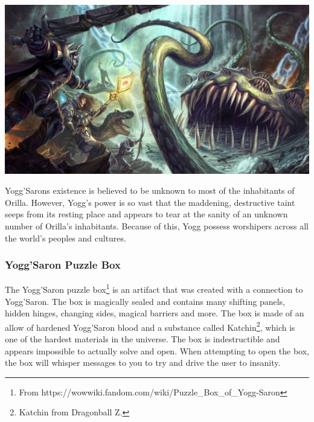 \begin{center}
	\includegraphics[width=\linewidth]{img/WoW/yogg-saron.jpg}
\end{center}

Yogg'Sarons existence is believed to be unknown to most of the inhabitants of Orilla. However, Yogg's power is so vast that the maddening, destructive taint seeps from its resting place and appears to tear at the sanity of an unknown number of Orilla's inhabitants. Because of this, Yogg possess worshipers across all the world's peoples and cultures.

\subsubsection{Yogg'Saron Puzzle Box}

The Yogg'Saron puzzle box\footnote{From https://wowwiki.fandom.com/wiki/Puzzle\_Box\_of\_Yogg-Saron} is an artifact that was created with a connection to Yogg'Saron. The box is magically sealed and contains many shifting panels, hidden hinges, changing sides, magical barriers and more. The box is made of an allow of hardened Yogg'Saron blood and a substance called Katchin\footnote{Katchin from Dragonball Z.}, which is one of the hardest materials in the universe. The box is indestructible and appears impossible to actually solve and open. When attempting to open the box, the box will whisper messages to you to try and drive the user to insanity. 

